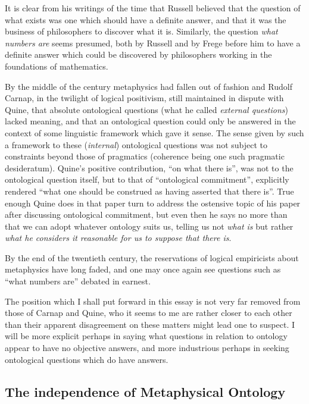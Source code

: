 \documentclass{rbjk}
\begin{document}
\begin{article}
It is clear from his writings of the time that Russell believed that the question of what exists was one which should have a definite answer, and that it was the business of philosophers to discover what it is.
Similarly, the question {\it what numbers are} seems presumed, both by Russell and by Frege before him to have a definite answer which could be discovered by philosophers working in the foundations of mathematics.

By the middle of the century metaphysics had fallen out of fashion and Rudolf Carnap, in the twilight of logical positivism, still maintained in dispute with Quine, that absolute ontological questions (what he called {\it external questions}) lacked meaning, and that an ontological question could only be answered in the context of some linguistic framework which gave it sense.
The sense given by such a framework to these ({\it internal}) ontological questions was not subject to constraints beyond those of pragmatics (coherence being one such pragmatic desideratum). 
Quine's positive contribution, ``on what there is'', was not to the ontological question itself, but to that of ``ontological commitment'', explicitly rendered ``what one should be construed as having asserted that there is''.
True enough Quine does in that paper turn to address the ostensive topic of his paper after discussing ontological commitment, but even then he says no more than that we can adopt whatever ontology suits us, telling us not {\it what is} but rather {\it what he considers it reasonable for us to suppose that there is}.

By the end of the twentieth century, the reservations of logical empiricists about metaphysics have long faded, and one may once again see questions such as ``what numbers are'' debated in earnest.

The position which I shall put forward in this essay is not very far removed from those of Carnap and Quine, who it seems to me are rather closer to each other than their apparent disagreement on these matters might lead one to suspect.
I will be more explicit perhaps in saying what questions in relation to ontology appear to have no objective answers, and more industrious perhaps in seeking ontological questions which do have answers.

\subsection{The independence of Metaphysical Ontology}


\end{article}
\end{document}
